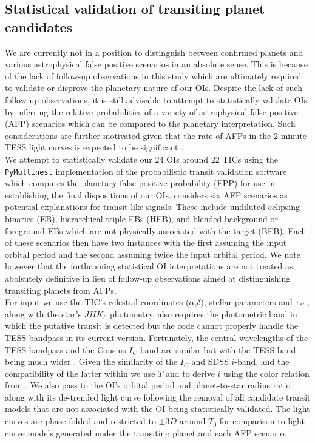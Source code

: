 \subsection{Statistical validation of transiting planet candidates} \label{sect:vespa}
We are currently not in a position to distinguish between confirmed planets and various astrophysical false
positive scenarios in an absolute sense. This is because of the lack of follow-up observations in this study
which are ultimately required to validate or disprove the planetary nature of our OIs. 
Despite the lack of such follow-up observations, it is still advisable to attempt to statistically
validate OIs by inferring the relative probabilities of a variety of astrophysical false
positive (AFP) scenarios which can be compared to the planetary interpretation.
Such considerations are further motivated given that the rate of AFPs in
the 2 minute TESS light curves is expected to be significant \citep[$\sim 60$\%;][]{sullivan15}. \\

We attempt to statistically validate our 24 OIs around 22 TICs using the \texttt{PyMultinest}
\citep{buchner14} implementation of the probabilistic transit validation software
\vespa{} \citep{morton12,morton15} which computes the planetary false positive probability (FPP)
for use in establishing the final dispositions of our OIs.
\vespa{} considers six AFP scenarios as potential explanations for transit-like
signals. These include undiluted eclipsing binaries (EB), hierarchical triple EBs (HEB), and blended
background or foreground EBs which are not physically associated with the target (BEB). Each of
these scenarios then have two instances with the first assuming the input orbital period and the
second assuming twice the input orbital period.
We note however that the forthcoming statistical OI interpretations are not treated as abolsutely
definitive in lieu of follow-up observations aimed at distinguishing transiting planets from AFPs. \\

For \vespa{} input we use the TIC's celestial coordinates ($\alpha$,$\delta$),
stellar parameters \teff{,} \logg{,} and $\varpi$, along
with the star's $JHK_{\text{S}}$ photometry. \vespa{} also requires the photometric band in which the
putative transit is detected but the code cannot properly handle the TESS bandpass in its current
version. Fortunately, the central wavelengths of the TESS bandpass and the Cousins $I_C$-band
are similar but with the TESS band being much wider \citep{sullivan15}. Given the similarity of the
$I_C$ and SDSS $i$-band, and the compatibility of the latter within \vespa{,} we use $T$ and
\Ks{} to derive $i$ using the color relation from \cite{muirhead18}. We also pass to \vespa{} the
OI's orbital period and planet-to-star radius ratio along with 
its de-trended light curve following the removal of all candidate transit models that are not associated
with the OI being statistically validated. The light curves are phase-folded and restricted
to $\pm 3D$ around $T_0$ for comparison to light curve models generated under the transiting planet
and each AFP scenario. \\

